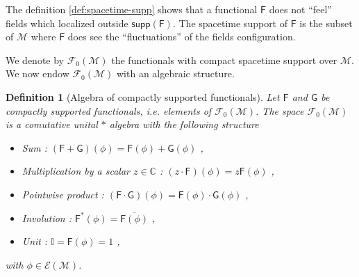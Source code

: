 \documentclass[10pt]{book}
\newcommand{\supp}{\mathsf{supp}}
\newcommand{\Ecal}{\mathcal{E}}
\newcommand{\Fcal}{\mathcal{F}}
\newcommand{\Mcal}{\mathcal{M}}
\newcommand{\Cbb}{\mathbb{C}}
\newcommand{\Ibb}{\mathbb{I}}
\newcommand{\Fsf}{\mathsf{F}}
\newcommand{\Gsf}{\mathsf{G}}
\theoremstyle{break}
\newtheorem{definition}{Definition}
\begin{document}
The definition \ref{def:spacetime-supp} shows that a functional $\Fsf$ does not ``feel'' fields which localized outside $\supp(\Fsf)$. The spacetime support of $\Fsf$ is the subset of $\Mcal$ where $\Fsf$ does see the ``fluctuations'' of the fields configuration.




\bigskip


We denote by $\Fcal_0(\Mcal)$ the functionals with compact spacetime support over $\Mcal$. We now endow $\Fcal_0(\Mcal)$ with an algebraic structure. 


\begin{definition}[Algebra of compactly supported functionals] \label{def:algebra-comp.supp.func.}
Let $\Fsf$ and $\Gsf$ be compactly supported functionals, i.e. elements of $\Fcal_0(\Mcal)$. The space $\Fcal_0(\Mcal)$ is a comutative unital $\ast$ algebra with the following structure
%
\begin{itemize}
\item Sum : $(\Fsf+\Gsf)(\phi) = \Fsf(\phi) + \Gsf(\phi)$ ,
\item Multiplication by a scalar $z\in\Cbb$ : $(z \cdot \Fsf)(\phi) = z \Fsf(\phi)$ ,
\item Pointwise product : $(\Fsf \cdot \Gsf)(\phi) = \Fsf(\phi) \cdot \Gsf(\phi)$ ,
\item Involution : $\Fsf^\ast(\phi) = \overline{\Fsf(\phi)}$ ,
\item Unit : $\Ibb = \Fsf(\phi) = 1$ ,
\end{itemize}
%
with $\phi \in \Ecal(\Mcal)$.
\end{definition}
\end{document}
